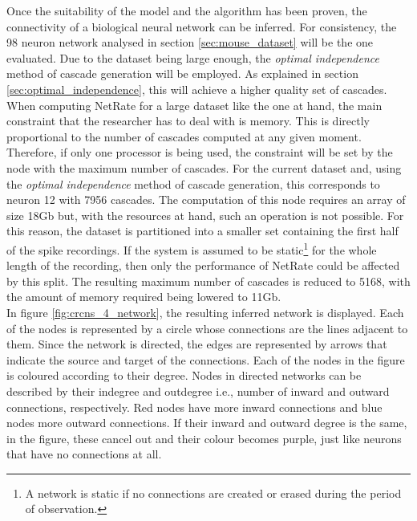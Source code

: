Once the suitability of the model and the algorithm has been proven, the connectivity of a biological neural network can be inferred. For consistency, the 98 neuron network analysed in section \ref{sec:mouse_dataset} will be the one evaluated. Due to the dataset being large enough, the \textit{optimal independence} method of cascade generation will be employed. As explained in section \ref{sec:optimal_independence}, this will achieve a higher quality set of cascades.\\

When computing NetRate for a large dataset like the one at hand, the main constraint that the researcher has to deal with is memory. This is directly proportional to the number of cascades computed at any given moment. Therefore, if only one processor is being used, the constraint will be set by the node with the maximum number of cascades. For the current dataset and, using the \textit{optimal independence} method of cascade generation, this corresponds to neuron 12 with 7956 cascades. The computation of this node requires an array of size 18Gb but, with the resources at hand, such an operation is not possible. For this reason, the dataset is partitioned into a smaller set containing the first half of the spike recordings. If the system is assumed to be static\footnote{A network is static if no connections are created or erased during the period of observation.} for the whole length of the recording, then only the performance of NetRate could be affected by this split. The resulting maximum number of cascades is reduced to 5168, with the amount of memory required being lowered to 11Gb.\\

In figure \ref{fig:crcns_4_network}, the resulting inferred network is displayed. Each of the nodes is represented by a circle whose connections are the lines adjacent to them. Since the network is directed, the edges are represented by arrows that indicate the source and target of the connections. Each of the nodes in the figure is coloured according to their degree. Nodes in directed networks can be described by their indegree and outdegree i.e., number of inward and outward connections, respectively. Red nodes have more inward connections and blue nodes more outward connections. If their inward and outward degree is the same, in the figure, these cancel out and their colour becomes purple, just like neurons that have no connections at all. \\

